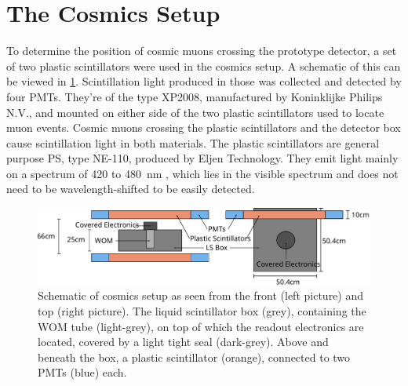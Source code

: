 

	
	

\section{The Cosmics Setup}

	To determine the position of cosmic muons crossing the prototype detector, a set of two plastic scintillators were used in the cosmics setup. A schematic of this can be viewed in \ref{fig:cosmics-setup}.
	Scintillation light produced in those was collected and detected by four \acsp{PMT}. They're of the type XP2008, manufactured by Koninklijke Philips N.V., and mounted on either side of the two plastic scintillators used to locate muon events.
 	Cosmic muons crossing the plastic scintillators and the detector box cause scintillation light in both materials. The plastic scintillators are general purpose \ac{PS}, type NE-110, produced by Eljen Technology. They emit light mainly on a spectrum of 420 to \SI{480}{\nano\meter} \cite{ELJEN-site}, which lies in the visible spectrum and does not need to be wavelength-shifted to be easily detected.


\begin{figure}
	\centering
	\includegraphics[width=\textwidth]{pictures/cosmics.pdf}
	\caption{Schematic of cosmics setup as seen from the front (left picture) and top (right picture). The liquid scintillator box (grey), containing the \ac{WOM} tube (light-grey), on top of which the readout electronics are located, covered by a light tight seal (dark-grey). Above and beneath the box, a plastic scintillator (orange), connected to two \acsp{PMT} (blue) each.}
	\label{fig:cosmics-setup}
\end{figure}

